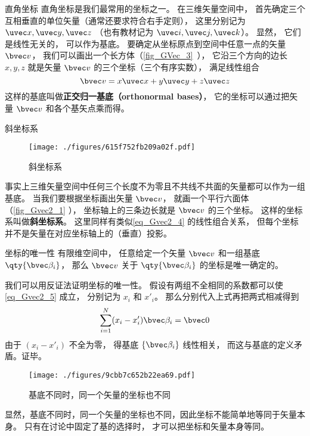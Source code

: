 \begin{example}{直角坐标}
直角坐标是我们最常用的坐标之一。 在三维矢量空间中， 首先确定三个互相垂直的单位矢量（通常还要求符合右手定则）， 这里分别记为 $\uvec x, \uvec y, \uvec z$ （也有教材记为 $\uvec i, \uvec j, \uvec k$）。 显然， 它们是线性无关的， 可以作为基底。 要确定从坐标原点到空间中任意一点的矢量 $\bvec v$， 我们可以画出一个长方体（\autoref{fig_GVec_3}~）， 它沿三个方向的边长 $x, y, z$ 就是矢量 $\bvec v$ 的三个坐标（三个有序实数）， 满足线性组合
\begin{equation}\label{eq_Gvec2_4}
\bvec v = x\uvec x + y\uvec y + z\uvec z
\end{equation}
这样的基底叫做\textbf{正交归一基底（orthonormal bases）}， 它的坐标可以通过把矢量 $\bvec v$ 和各个基矢点乘而得。
\end{example}

\begin{example}{斜坐标系}\label{ex_Gvec2_1}
\begin{figure}[ht]
\centering
\texttt{[image: ./figures/615f752fb209a02f.pdf]}
\caption{斜坐标系} \label{fig_Gvec2_1}
\end{figure}
事实上三维矢量空间中任何三个长度不为零且不共线不共面的矢量都可以作为一组基底。 当我们要根据坐标画出矢量 $\bvec v$， 就画一个平行六面体（\autoref{fig_Gvec2_1} ）， 坐标轴上的三条边长就是 $\bvec v$ 的三个坐标。 这样的坐标系叫做\textbf{斜坐标系}。 这里同样有类似\autoref{eq_Gvec2_4} 的线性组合关系， 但每个坐标并不是矢量在对应坐标轴上的（垂直）投影。
\end{example}

\begin{theorem}{坐标的唯一性}
有限维空间中， 任意给定一个矢量 $\bvec v$ 和一组基底 $\qty{\bvec \beta_i}$， 那么 $\bvec v$ 关于 $\qty{\bvec \beta_i}$ 的坐标是唯一确定的。
\end{theorem}
我们可以用反证法证明坐标的唯一性。 假设有两组不全相同的系数都可以使\autoref{eq_Gvec2_5} 成立， 分别记为 $x_i$ 和 $x'_i$。 那么分别代入上式再把两式相减得到
\begin{equation}
\sum_{i=1}^N (x_i-x'_i) \bvec \beta_i = \bvec 0
\end{equation}
由于 $(x_i-x'_i)$ 不全为零， 得基底 $\{\bvec \beta_i\}$ 线性相关， 而这与基底的定义矛盾。证毕。
\begin{figure}[ht]
\centering
\texttt{[image: ./figures/9cbb7c652b22ea69.pdf]}
\caption{基底不同时，同一个矢量的坐标也不同} \label{fig_Gvec2_2}
\end{figure}
显然，基底不同时，同一个矢量的坐标也不同，因此坐标不能简单地等同于矢量本身。 只有在讨论中固定了基的选择时， 才可以把坐标和矢量本身等同。

